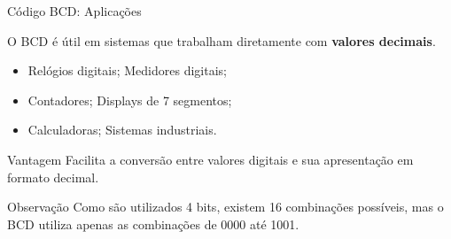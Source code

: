 
\begin{frame}{Código BCD: Aplicações}
    \small

    O BCD é útil em sistemas que trabalham diretamente com
    \textbf{valores decimais}.

    \begin{itemize}
        \item Relógios digitais; Medidores digitais;
        \item Contadores; Displays de 7 segmentos;
        \item Calculadoras; Sistemas industriais.
    \end{itemize}

    \begin{block}{Vantagem}
        Facilita a conversão entre valores digitais e sua
        apresentação em formato decimal.
    \end{block}

    \begin{alertblock}{Observação}
        Como são utilizados 4 bits, existem 16 combinações possíveis,
        mas o BCD utiliza apenas as combinações de 0000 até 1001.
    \end{alertblock}

\end{frame}